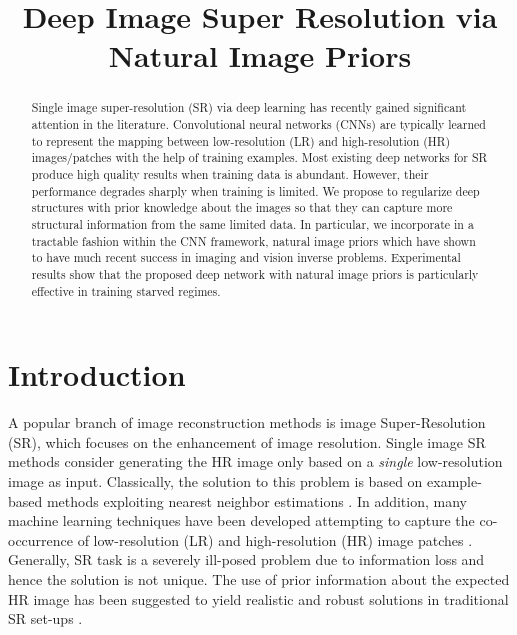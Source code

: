 \documentclass[9pt]{article}
\title{Deep Image Super Resolution via Natural Image Priors}
\begin{document}
\maketitle
\begin{abstract}
Single image super-resolution (SR) via deep learning has recently gained significant attention in the literature. Convolutional neural networks (CNNs) are typically learned to represent the mapping between low-resolution (LR) and high-resolution (HR) images/patches with the help of training examples. Most existing deep networks for SR produce high quality results when training data is abundant. However, their performance degrades sharply when training is limited. We propose to regularize deep structures with prior knowledge about the images so that they can capture more structural information from the same limited data. In particular, we incorporate in a tractable fashion within the CNN framework, natural image priors which have shown to have much recent success in imaging and vision inverse problems. Experimental results show that the proposed deep network with natural image priors is particularly effective in training starved regimes.
\end{abstract}

\section{Introduction}
\label{sec:intro}

A popular branch of image reconstruction methods is image Super-Resolution (SR), which focuses on the enhancement of image resolution. %
Single image SR methods consider generating the HR image only based on a \emph{single} low-resolution image as input. Classically, the solution to this problem is based on example-based methods exploiting nearest neighbor estimations \cite{Freeman:ExampleBasedSR_CompGraph2002, Glasner:SRSingle2009ICCV}. In addition, many machine learning techniques have been developed attempting to capture the co-occurrence of low-resolution (LR) and high-resolution (HR) image patches \cite{Sun:HallucinationSR_CVPR2003, Chang:NeighborEmbeddingSR_CVPR2004}.
Generally, SR task is a severely  ill-posed problem due to information loss and hence the solution is not unique. The use of prior information about the expected HR image has been suggested to yield realistic and robust solutions in traditional SR set-ups \cite{Tappen:SparsePriorSR_2003,Fattal:SRstatistic_ACM2007,Dai:edgeSR_CVPR2007, mousavi2016ColorSR_ICIP}.
\end{document}
